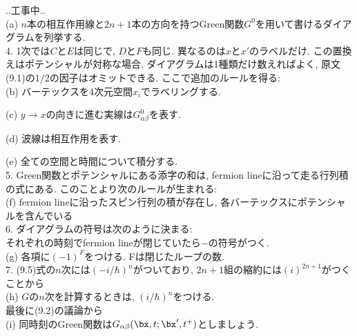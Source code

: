 \documentclass[10.5pt,a4paper]{jreport}
\begin{document}
..工事中..\\

(a) $n$本の相互作用線と$2n + 1$本の方向を持つGreen関数$G^0$を用いて書けるダイアグラムを列挙する.\\

4. 1次では$C$と$E$は同じで, $D$と$F$も同じ. 異なるのは$x$と$x'$のラベルだけ. この置換えはポテンシャルが対称な場合. ダイアグラムは1種類だけ数えればよく, 原文(9.1)の$1/2$の因子はオミットできる.
ここで追加のルールを得る:\\

(b) バーテックスを4次元空間$x_i$でラベリングする. 

(c) $y\rightarrow x$の向きに進む実線は$G_{\alpha\beta}^0$を表す.

(d) 波線は相互作用を表す.

(e) 全ての空間と時間について積分する.\\

5. Green関数とポテンシャルにある添字の和は, fermion lineに沿って走る行列積の式にある. このことより次のルールが生まれる:\\ 

(f) fermion lineに沿ったスピン行列の積が存在し, 各バーテックスにポテンシャルを含んでいる\\

6. ダイアグラムの符号は次のように決まる:\\

それぞれの時刻でfermion lineが閉じていたら$-$の符号がつく. \\

(g) 各項に$(-1)^F$をつける. Fは閉じたループの数. \\

7. (9.5)式の$n$次には$(-i/\hbar)^n$がついており, $2n+1$組の縮約には$(i)^{2n+1}$がつくことから\\

(h) $G$の$n$次を計算するときは, $(i/\hbar)^n$をつける. \\

最後に(9.2)の議論から\\

(i) 同時刻のGreen関数は$G_{\alpha\beta}(\bx, t; \bx', t^+)$としましょう.
\end{document}
